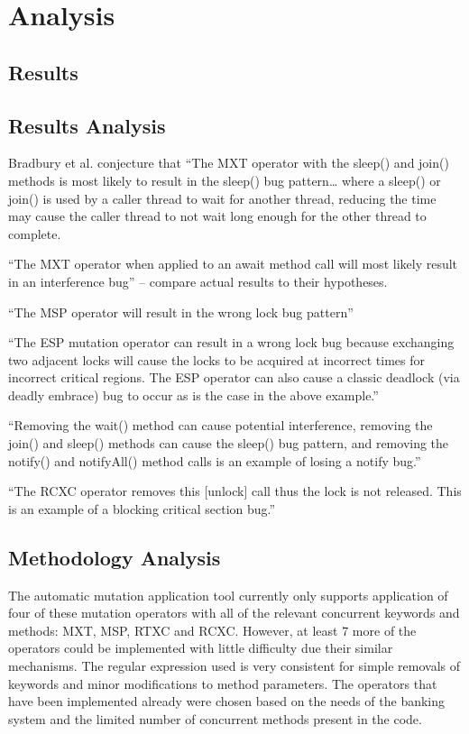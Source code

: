 \documentclass[a4paper,12pt]{article}
\begin{document}
	
\newpage	
\section{Analysis}
    \subsection{Results}
    

\subsection{Results Analysis}

Bradbury et al. conjecture that “The MXT operator with the sleep() and join() methods is most likely to result in the sleep() bug pattern… where a sleep() or join() is used by a caller thread to wait for another thread, reducing the time may cause the caller thread to not wait long enough for the other thread to complete.  

“The MXT operator when applied to an await method call will most likely result in an interference bug” – compare actual results to their hypotheses.

“The MSP operator will result in the wrong lock bug pattern”

“The ESP mutation operator can result in a wrong lock bug because exchanging two adjacent locks will cause the locks to be acquired at incorrect times for incorrect critical regions. The ESP operator can also cause a classic deadlock (via deadly embrace) bug to occur as is the case in the above example.”

“Removing the wait() method can cause potential interference, removing the join() and sleep() methods can cause the sleep() bug pattern, and removing the notify() and notifyAll() method calls is an example of losing a notify bug.”

“The RCXC operator removes this [unlock] call thus the lock is not released. This is an example of a blocking critical section bug.”

    
    
    
    
\subsection{Methodology Analysis}

The automatic mutation application tool currently only supports application of four of these mutation operators with all of the relevant concurrent keywords and methods: MXT, MSP, RTXC and RCXC. However, at least 7 more of the operators could be implemented with little difficulty due their similar mechanisms. The regular expression used is very consistent for simple removals of keywords and minor modifications to method parameters. The operators that have been implemented already were chosen based on the needs of the banking system and the limited number of concurrent methods present in the code.   
\end{document}
